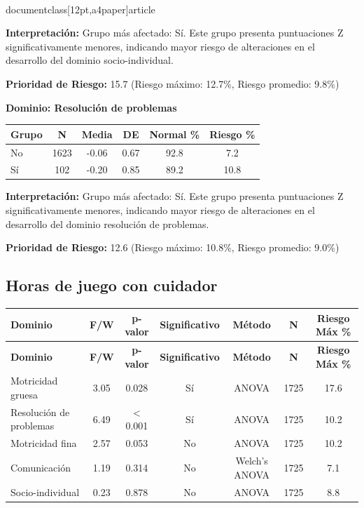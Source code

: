 \\documentclass[12pt,a4paper]{article}
\begin{document}
\textbf{Interpretación:} Grupo más afectado: Sí. Este grupo presenta puntuaciones Z significativamente menores, indicando mayor riesgo de alteraciones en el desarrollo del dominio socio-individual.

\textbf{Prioridad de Riesgo:} 15.7 (Riesgo máximo: 12.7\%, Riesgo promedio: 9.8\%)


\vspace{0.5cm}


\textbf{Dominio: Resolución de problemas}


\begin{center}
\begin{tabular}{|l|c|c|c|c|c|}
\hline
\textbf{Grupo} & \textbf{N} & \textbf{Media} & \textbf{DE} & \textbf{Normal \%} & \textbf{Riesgo \%} \\
\hline
No & 1623 & -0.06 & 0.67 & 92.8 & 7.2 \\
Sí & 102 & -0.20 & 0.85 & 89.2 & 10.8 \\

\hline
\end{tabular}
\end{center}


\textbf{Interpretación:} Grupo más afectado: Sí. Este grupo presenta puntuaciones Z significativamente menores, indicando mayor riesgo de alteraciones en el desarrollo del dominio resolución de problemas.

\textbf{Prioridad de Riesgo:} 12.6 (Riesgo máximo: 10.8\%, Riesgo promedio: 9.0\%)


\vspace{0.5cm}


\subsection{Horas de juego con cuidador}


\begin{longtable}{|l|c|c|c|c|c|c|}
\hline
\textbf{Dominio} & \textbf{F/W} & \textbf{p-valor} & \textbf{Significativo} & \textbf{Método} & \textbf{N} & \textbf{Riesgo Máx \%} \\
\hline
\endfirsthead

\hline
\textbf{Dominio} & \textbf{F/W} & \textbf{p-valor} & \textbf{Significativo} & \textbf{Método} & \textbf{N} & \textbf{Riesgo Máx \%} \\
\hline
\endhead

\hline
\endfoot

\hline
\endlastfoot

Motricidad gruesa & 3.05 & 0.028 & Sí & ANOVA & 1725 & 17.6 \\
Resolución de problemas & 6.49 & < 0.001 & Sí & ANOVA & 1725 & 10.2 \\
Motricidad fina & 2.57 & 0.053 & No & ANOVA & 1725 & 10.2 \\
Comunicación & 1.19 & 0.314 & No & Welch's ANOVA & 1725 & 7.1 \\
Socio-individual & 0.23 & 0.878 & No & ANOVA & 1725 & 8.8 \\

\end{longtable}
\end{document}
